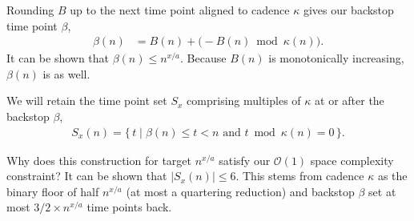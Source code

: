 Rounding $B$ up to the next time point aligned to cadence $\kappa$ gives our backstop time point $\beta$,
\begin{align*}
  \beta(n)
  &=
  B(n) + \big(-B(n) \bmod \kappa(n)\big).
\end{align*}
It can be shown that $\beta(n) \leq n^{x/a}$.
Because $B(n)$ is monotonically increasing, $\beta(n)$ is as well.

We will retain the time point set $S_x$ comprising multiples of $\kappa$ at or after the backstop $\beta$,
\begin{align*}
  S_x(n) = \{\, t \mid \beta(n) \leq t < n \text{ and } t \bmod \kappa(n) = 0 \,\}.
\end{align*}

Why does this construction for target $n^{x/a}$ satisfy our $\mathcal{O}(1)$ space complexity constraint?
It can be shown that $|S_x(n)| \leq 6$.
This stems from cadence $\kappa$ as the binary floor of half $n^{x/a}$ (at most a quartering reduction) and backstop $\beta$ set at most $3/2 \times n^{x/a}$ time points back.






